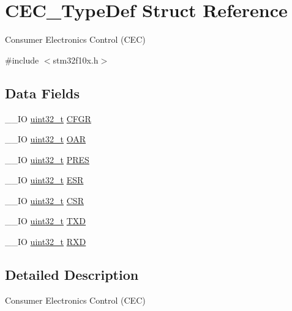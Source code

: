 \hypertarget{struct_c_e_c___type_def}{\section{C\-E\-C\-\_\-\-Type\-Def Struct Reference}
\label{struct_c_e_c___type_def}
}


Consumer Electronics Control (C\-E\-C)  




{\ttfamily \#include $<$stm32f10x.\-h$>$}

\subsection*{Data Fields}
\begin{DoxyCompactItemize}
\item 
\-\_\-\-\_\-\-I\-O \hyperlink{stdint_8h_a435d1572bf3f880d55459d9805097f62}{uint32\-\_\-t} \hyperlink{struct_c_e_c___type_def_a91a55cd277c20e5c5ad228fd9013d014}{C\-F\-G\-R}
\item 
\-\_\-\-\_\-\-I\-O \hyperlink{stdint_8h_a435d1572bf3f880d55459d9805097f62}{uint32\-\_\-t} \hyperlink{struct_c_e_c___type_def_aa578935e8a0795a0a7494f4d281bc43d}{O\-A\-R}
\item 
\-\_\-\-\_\-\-I\-O \hyperlink{stdint_8h_a435d1572bf3f880d55459d9805097f62}{uint32\-\_\-t} \hyperlink{struct_c_e_c___type_def_a2e1d5865f3d49a195e58f265b425256e}{P\-R\-E\-S}
\item 
\-\_\-\-\_\-\-I\-O \hyperlink{stdint_8h_a435d1572bf3f880d55459d9805097f62}{uint32\-\_\-t} \hyperlink{struct_c_e_c___type_def_a90adcbf5ee626747170b2f208770628f}{E\-S\-R}
\item 
\-\_\-\-\_\-\-I\-O \hyperlink{stdint_8h_a435d1572bf3f880d55459d9805097f62}{uint32\-\_\-t} \hyperlink{struct_c_e_c___type_def_ad9aa13645f701c5457fbf51a9ecf7aa4}{C\-S\-R}
\item 
\-\_\-\-\_\-\-I\-O \hyperlink{stdint_8h_a435d1572bf3f880d55459d9805097f62}{uint32\-\_\-t} \hyperlink{struct_c_e_c___type_def_a462a952588fc45732d4545dbe79356da}{T\-X\-D}
\item 
\-\_\-\-\_\-\-I\-O \hyperlink{stdint_8h_a435d1572bf3f880d55459d9805097f62}{uint32\-\_\-t} \hyperlink{struct_c_e_c___type_def_a13d5b0e5228d5cca9f7c5d8533705d21}{R\-X\-D}
\end{DoxyCompactItemize}


\subsection{Detailed Description}
Consumer Electronics Control (C\-E\-C) 

